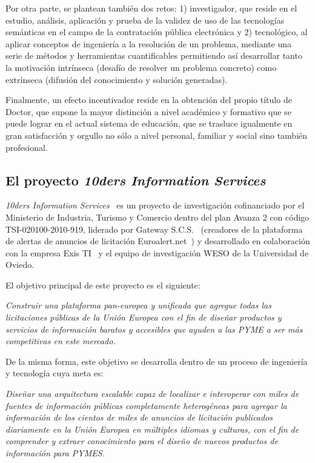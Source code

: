 Por otra parte, se plantean también dos retos: 1) investigador, que reside en el estudio,
análisis, aplicación y prueba de la validez de uso de 
las tecnologías semánticas en el campo de la contratación pública electrónica y 2) tecnológico, al aplicar
conceptos de ingeniería a la resolución de un problema, mediante una serie de métodos y herramientas
cuantificables permitiendo así desarrollar tanto la motivación intrínseca (desafío de resolver
un problema concreto) como extrínseca (difusión del conocimiento y solución generadas).

Finalmente, un efecto incentivador reside en la obtención del propio título de Doctor, que supone
la mayor distinción a nivel académico y formativo que se puede lograr en el actual sistema
de educación, que se trasluce igualmente en gran satisfacción y orgullo no sólo a nivel personal, familiar y social sino también 
profesional. 

\subsection{El proyecto \textit{10ders Information Services}}\label{10ders}
\textit{\gls{10ders} Information Services}~\cite{10ders} es un proyecto de investigación
cofinanciado por el Ministerio de Industria, Turismo y Comercio dentro del plan Avanza 2 
con código TSI-020100-2010-919, liderado por Gateway S.C.S.~\cite{gateway} (creadores de la plataforma
de alertas de anuncios de licitación Euroalert.net~\cite{euroalert}) y desarrollado en colaboración con la empresa Exis TI~\cite{exis} y el equipo
de investigación \gls{WESO} de la Universidad de Oviedo. 

El objetivo principal de este proyecto es el siguiente:

\textit{Construir una plataforma pan-europea y unificada que agregue todas
las licitaciones públicas de la Unión \gls{Europea} con el fin de diseñar productos y
servicios de información baratos y accesibles que ayuden a las \gls{PYME} a
ser más competitivas en este mercado.}

De la misma forma, este objetivo se desarrolla dentro de un proceso de ingeniería
y tecnología cuya meta es:

\textit{Diseñar una arquitectura escalable capaz de localizar e interoperar con miles
de fuentes de información públicas completamente heterogéneas para agregar
la información de los cientos de miles de anuncios de licitación publicados
diariamente en la Unión Europea en múltiples idiomas y culturas, con el fin de
comprender y extraer conocimiento para el diseño de nuevos productos de
información para PYMES.}

